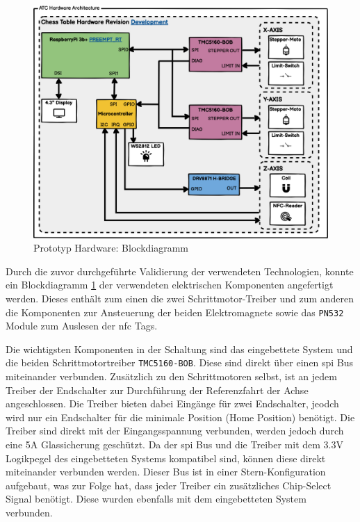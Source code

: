 \begin{figure}
\centering
\includegraphics{images/ATC_Hardware_Architecture_DK.png}
\caption{Prototyp Hardware: Blockdiagramm
\label{ATC_Hardware_Architecture_DK}}
\end{figure}

Durch die zuvor durchgeführte Validierung der verwendeten Technologien,
konnte ein Blockdiagramm \ref{ATC_Hardware_Architecture_DK} der
verwendeten elektrischen Komponenten angefertigt werden. Dieses enthält
zum einen die zwei Schrittmotor-Treiber und zum anderen die Komponenten
zur Ansteuerung der beiden Elektromagnete sowie das
\passthrough{\lstinline!PN532!} Module zum Auslesen der \gls{nfc} Tags.

Die wichtigsten Komponenten in der Schaltung sind das eingebettete
System und die beiden Schrittmotortreiber
\passthrough{\lstinline!TMC5160-BOB!}. Diese sind direkt über einen
\gls{spi} Bus miteinander verbunden. Zusätzlich zu den Schrittmotoren
selbst, ist an jedem Treiber der Endschalter zur Durchführung der
Referenzfahrt der Achse angeschlossen. Die Treiber bieten dabei Eingänge
für zwei Endschalter, jeodch wird nur ein Endschalter für die minimale
Position (Home Position) benötigt. Die Treiber sind direkt mit der
Eingangsspannung verbunden, werden jedoch durch eine 5A Glassicherung
geschützt. Da der \gls{spi} Bus und die Treiber mit dem 3.3V Logikpegel
des eingebetteten Systems kompatibel sind, können diese direkt
miteinander verbunden werden. Dieser Bus ist in einer
Stern-Konfiguration aufgebaut, was zur Folge hat, dass jeder Treiber ein
zusätzliches Chip-Select Signal benötigt. Diese wurden ebenfalls mit dem
eingebetteten System verbunden.

